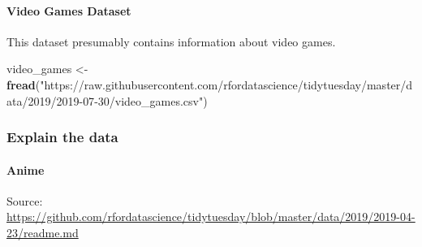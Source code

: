 \documentclass[
]{book}
\newenvironment{Shaded}{\begin{snugshade}}{\end{snugshade}}
\newcommand{\FunctionTok}[1]{\textcolor[rgb]{0.13,0.29,0.53}{\textbf{#1}}}
\newcommand{\NormalTok}[1]{#1}
\newcommand{\OtherTok}[1]{\textcolor[rgb]{0.56,0.35,0.01}{#1}}
\newcommand{\StringTok}[1]{\textcolor[rgb]{0.31,0.60,0.02}{#1}}
\begin{document}
\hypertarget{video-games-dataset}{%
\paragraph{Video Games Dataset}\label{video-games-dataset}}

This dataset presumably contains information about video games.

\begin{Shaded}
\begin{Highlighting}[]
\NormalTok{video\_games }\OtherTok{\textless{}{-}} \FunctionTok{fread}\NormalTok{(}\StringTok{"https://raw.githubusercontent.com/rfordatascience/tidytuesday/master/data/2019/2019{-}07{-}30/video\_games.csv"}\NormalTok{)}
\end{Highlighting}
\end{Shaded}

\hypertarget{explain-the-data}{%
\subsubsection*{Explain the data}\label{explain-the-data}}

\hypertarget{anime}{%
\paragraph*{Anime}\label{anime}}

Source: \url{https://github.com/rfordatascience/tidytuesday/blob/master/data/2019/2019-04-23/readme.md}
\end{document}
